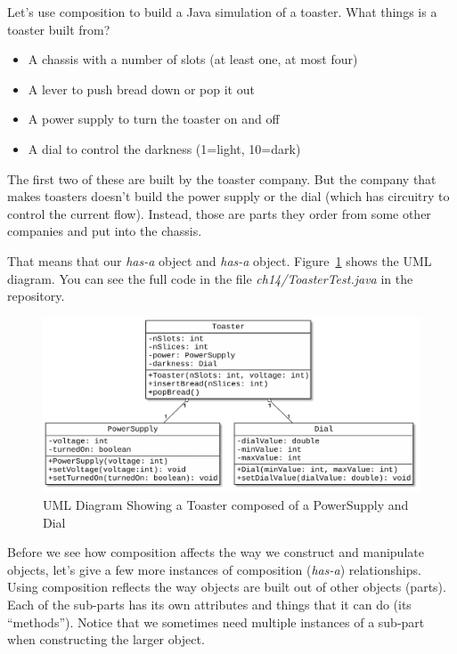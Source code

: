 Let's use composition to build a Java simulation of a toaster. What things is a toaster built from?

\begin{itemize}
\item A chassis with a number of slots (at least one, at most four)
\item A lever to push bread down or pop it out
\item A power supply to turn the toaster on and off
\item A dial to control the darkness (1=light, 10=dark)
\end{itemize}

The first two of these are built by the toaster company. But the company that makes toasters doesn't build the power supply or the dial (which has circuitry to control the current flow). Instead, those are parts they order from some other companies and put into the chassis.

That means that our  {\em has-a}  object and {\em has-a}  object. Figure~\ref{fig.toasterComposition} shows the UML diagram. You can see the full code in the file {\em ch14/ToasterTest.java} in the repository.

\begin{figure}[!h]
\begin{center}
\includegraphics[scale=0.5]{figs/ch14/toaster.pdf}
\caption{UML Diagram Showing a Toaster composed of a PowerSupply and Dial}
\label{fig.toasterComposition}
\end{center}
\end{figure}

Before we see how composition affects the way we construct and manipulate objects, let's give a few more instances of composition ({\em has-a}) relationships. Using composition reflects the way objects are built out of other objects (parts). Each of the sub-parts has its own attributes and things that it can do (its ``methods''). Notice that we sometimes need multiple instances of a sub-part when constructing the larger object.

